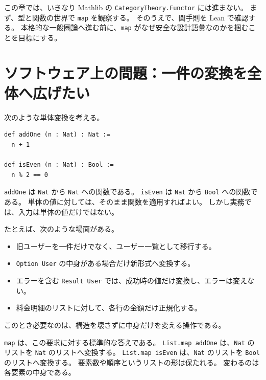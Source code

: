 
この章では、いきなり Mathlib の \texttt{CategoryTheory.Functor} には進まない。
まず、型と関数の世界で \texttt{map} を観察する。
そのうえで、関手則を Lean で確認する。
本格的な一般圏論へ進む前に、\texttt{map} がなぜ安全な設計語彙なのかを掴むことを目標にする。

\section{ソフトウェア上の問題：一件の変換を全体へ広げたい}

次のような単体変換を考える。

\begin{listing}[htbp]
\begin{verbatim}
def addOne (n : Nat) : Nat :=
  n + 1

def isEven (n : Nat) : Bool :=
  n % 2 == 0
\end{verbatim}
\caption{単体変換を用意する}
\label{lst:ch08_single_functions}
\end{listing}

\texttt{addOne} は \texttt{Nat} から \texttt{Nat} への関数である。
\texttt{isEven} は \texttt{Nat} から \texttt{Bool} への関数である。
単体の値に対しては、そのまま関数を適用すればよい。
しかし実務では、入力は単体の値だけではない。

\begin{softwarebox}
たとえば、次のような場面がある。
\begin{itemize}
\item 旧ユーザーを一件だけでなく、ユーザー一覧として移行する。
\item \texttt{Option User} の中身がある場合だけ新形式へ変換する。
\item エラーを含む \texttt{Result User} では、成功時の値だけ変換し、エラーは変えない。
\item 料金明細のリストに対して、各行の金額だけ正規化する。
\end{itemize}
このとき必要なのは、構造を壊さずに中身だけを変える操作である。
\end{softwarebox}

\texttt{map} は、この要求に対する標準的な答えである。
\texttt{List.map addOne} は、\texttt{Nat} のリストを \texttt{Nat} のリストへ変換する。
\texttt{List.map isEven} は、\texttt{Nat} のリストを \texttt{Bool} のリストへ変換する。
要素数や順序というリストの形は保たれる。
変わるのは各要素の中身である。

